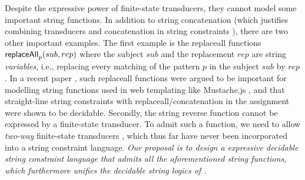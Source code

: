 Despite the expressive power of finite-state transducers, 
they cannot model some important string functions. In addition to string
concatenation (which justifies combining transducers and concatenation in 
string constraints \cite{LB16}), there are two other important examples. The 
first example is the 
replaceall functions $\mathsf{replaceAll}_p(sub,rep)$ where the subject $sub$ and the replacement 
$rep$ are string \emph{variables}, i.e., 
replacing every matching of the pattern $p$ in the subject $sub$ by $rep$.
In a recent paper \cite{CCHLW18},
such replaceall functions were argued to be important for modelling string 
functions used in web templating like Mustache.js \cite{Mustache}, and
that straight-line string constraints with replaceall/concatenation in the
assignment were shown to be decidable.
Secondly, the string reverse function cannot be expressed by a finite-state
transducer. To admit such a function, we need to allow \emph{two-way} 
finite-state transducers \cite{Berstel,Sakarovitch}, which thus far have never 
been incorporated into a string constraint language. \emph{Our proposal is to
design a expressive decidable string constraint language that admits all the
aforementioned string functions, which furthermore unifies the decidable string 
logics of \cite{CCHLW18,LB16}.}



%
%

